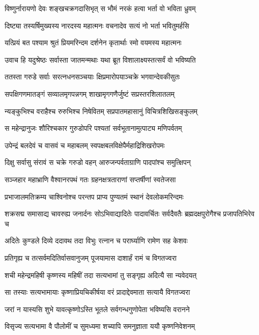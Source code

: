 \twolineshloka
{विष्णुर्नारायणो देवः शङ्खचक्रगदासिभृत्}
{स भौमं नरकं हत्वा भर्ता वो भविता ध्रुवम्}


\twolineshloka
{दिष्ट्या तस्यर्षिमुख्यस्य नारदस्य महात्मनः}
{वचनादेव सत्यं नो भर्ता भवितुमर्हसि}


\twolineshloka
{यत्प्रियं बत पश्याम श्रुतं प्रियमरिन्दम}
{दर्शनेन कृतार्थाः स्मो वयमस्य महात्मनः}


\twolineshloka
{उवाच हि यदुश्रेष्ठः सर्वास्ता जातमन्मथाः}
{यथा ब्रूत विशालाक्ष्यस्तत्सर्वं वो भविष्यति}


\twolineshloka
{ततस्ता गरुडे सर्वाः सरत्नधनसञ्चयाः}
{क्षिप्रमारोपयाञ्चक्रे भगवान्देवकीसुतः}


\twolineshloka
{सपक्षिगणमातङ्गं सव्यालमृगपन्नगम्}
{शाखामृगगणैर्जुष्टं सप्रस्तरशिलातलम्}


\twolineshloka
{न्यङ्कुभिश्च वराहैश्च रुरुभिश्च निषेवितम्}
{सप्रपातमहासानुं विचित्रशिखिसङ्कुलम्}


\twolineshloka
{स महेन्द्रानुजः शौरिश्चकार गुरुडोपरि}
{पश्यतां सर्वभूतानामुत्पाट्य मणिपर्वतम्}


\twolineshloka
{उपेन्द्रं बलदेवं च वासवं च महाबलम्}
{स्वपक्षबलविक्षेपैर्महाद्रिशिखरोपमः}


\twolineshloka
{दिक्षु सर्वासु संरावं स चक्रे गरुडो वहन्}
{आरुजन्पर्वताग्राणि पादपांश्च समुत्क्षिपन्}


\twolineshloka
{सञ्जहार महाभ्राणि वैश्वानरपथं गतः}
{ग्रहनक्षत्रताराणां सप्तर्षीणां स्वतेजसा}


\twolineshloka
{प्रभाजालमतिक्रम्य चाश्विनोश्च परन्तप}
{प्राप्य पुण्यतमं स्थानं देवलोकमरिन्दमः}


\threelineshloka
{शक्रसद्म समासाद्य चावरुह्य जनार्दनः}
{सोऽभिवाद्यादितेः पादावर्चितः सर्वदैवतैः}
{ब्रह्मदक्षपुरोगैश्च प्रजापतिभिरेव च}


\twolineshloka
{अदितेः कुण्डले दिव्ये ददावथ तदा विभुः}
{रत्नान च परार्घ्याणि रामेण सह केशवः}


\twolineshloka
{प्रतिगृह्य च तत्सर्वमदितिर्वासवानुजम्}
{पूजयामास दाशार्हं रामं च विगतज्वरा}


\twolineshloka
{शची महेन्द्रमहिषी कृष्णस्य महिषीं तदा}
{सत्यभामां तु सङ्गृह्य अदित्यै सा न्यवेदयत्}


\twolineshloka
{सा तस्याः सत्यभामायाः कृष्णाप्रियचिकीर्षया}
{वरं प्रादाद्देवमाता सत्यायै विगतज्वरा}


\twolineshloka
{जरां न यास्यसि शुभे यावत्कृष्णोऽस्ति भूतले}
{सर्वगन्धगुणोपेता भविष्यसि वरानने}


\twolineshloka
{विसृज्य सत्यभामा वै पौलोमीं च सुमध्यमा}
{शच्यापि समनुज्ञाता ययौ कृष्णनिवेशनम्}



